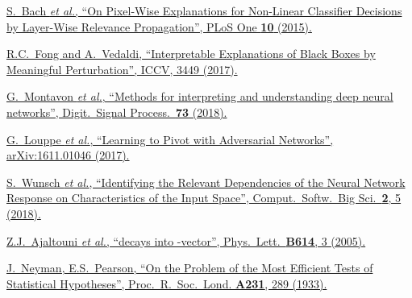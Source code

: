 {\begin{thebibliography}{xxx}
	\href{https://doi.org/10.1371/journal.pone.0130140}{S.~Bach \textit{et al.}, \enquote{On Pixel-Wise Explanations for Non-Linear Classifier Decisions by Layer-Wise Relevance Propagation}, PLoS One \textbf{10} (2015).}

	\href{https://doi.org/10.1109/ICCV.2017.371}{R.C.~Fong and A.~Vedaldi, \enquote{Interpretable Explanations of Black Boxes by Meaningful Perturbation}, ICCV, 3449 (2017).}

	\href{https://doi.org/10.1016/j.dsp.2017.10.011}{G.~Montavon \textit{et al.}, \enquote{Methods for interpreting and understanding deep neural networks}, Digit.\ Signal Process.\ \textbf{73} (2018).}

	\href{https://arxiv.org/abs/1611.01046}{G.~Louppe \textit{et al.}, \enquote{Learning to Pivot with Adversarial Networks}, arXiv:1611.01046 (2017).}

	\href{https://doi.org/10.1007/s41781-018-0012-1}{S.~Wunsch \textit{et al.}, \enquote{Identifying the Relevant Dependencies of the Neural Network Response on Characteristics of the Input Space}, Comput.\ Softw.\ Big Sci.\ \textbf{2}, 5 (2018).}

	\href{https://doi.org/10.1016/j.physletb.2005.04.014}{Z.J.~Ajaltouni \textit{et al.}, \enquote{\Lb decays into \Lz-vector}, Phys.\ Lett.\ \textbf{B614}, 3 (2005).}

	\href{https://www.jstor.org/stable/91247}{J.~Neyman, E.S.~Pearson, \enquote{On the Problem of the Most Efficient Tests of Statistical Hypotheses}, 	Proc.\ R.\ Soc.\ Lond. \textbf{A231}, 289 (1933).}

\end{thebibliography}}
